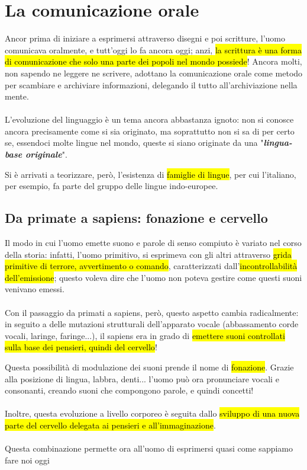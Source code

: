 \section{La comunicazione orale}
Ancor prima di iniziare a esprimersi attraverso disegni e poi scritture, l'uomo comunicava oralmente, e tutt'oggi lo fa ancora oggi; anzi, \hl{la scrittura è una forma di comunicazione che solo una parte dei popoli nel mondo possiede}! Ancora molti, non sapendo ne leggere ne scrivere, adottano la comunicazione orale come metodo per scambiare e archiviare informazioni, delegando il tutto all'archiviazione nella mente.
\\\\L'evoluzione del linguaggio è un tema ancora abbastanza ignoto: non si conosce ancora precisamente come si sia originato, ma soprattutto non si sa di per certo se, essendoci molte lingue nel mondo, queste si siano originate da una "\textbf{\textit{lingua-base originale}}".

Si è arrivati a teorizzare, però, l'esistenza di \hl{famiglie di lingue}, per cui l'italiano, per esempio, fa parte del gruppo delle lingue indo-europee.
\subsection{Da primate a sapiens: fonazione e cervello}
Il modo in cui l'uomo emette suono e parole di senso compiuto è variato nel corso della storia: infatti, l'uomo primitivo, si esprimeva con gli altri attraverso \hl{grida primitive di terrore, avvertimento o comando}, caratterizzati dall'\hl{incontrollabilità dell'emissione}; questo voleva dire che l'uomo non poteva gestire come questi suoni venivano emessi.
\\\\Con il passaggio da primati a sapiens, però, questo aspetto cambia radicalmente: in seguito a delle mutazioni strutturali dell'apparato vocale (abbassamento corde vocali, laringe, faringe...), il sapiens era in grado di \hl{emettere suoni controllati sulla base dei pensieri, quindi del cervello}!

Questa possibilità di modulazione dei suoni prende il nome di \hl{fonazione}. Grazie alla posizione di lingua, labbra, denti... l'uomo può ora pronunciare vocali e consonanti, creando suoni che compongono parole, e quindi concetti!
\\\\Inoltre, questa evoluzione a livello corporeo è seguita dallo \hl{sviluppo di una nuova parte del cervello delegata ai pensieri e all'immaginazione}. 
\\\\Questa combinazione permette ora all'uomo di esprimersi quasi come sappiamo fare noi oggi

